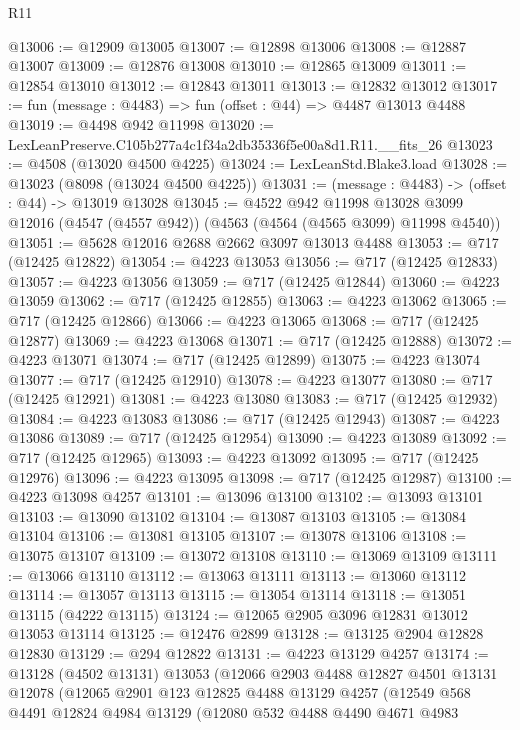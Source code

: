 \begin{lexlean}{R11}
\begin{coremodule}
@13006 := @12909 @13005
@13007 := @12898 @13006
@13008 := @12887 @13007
@13009 := @12876 @13008
@13010 := @12865 @13009
@13011 := @12854 @13010
@13012 := @12843 @13011
@13013 := @12832 @13012
@13017 := fun (message : @4483) => fun (offset : @44) => @4487 @13013 @4488
@13019 := @4498 @942 @11998
@13020 := LexLeanPreserve.C105b277a4c1f34a2db35336f5e00a8d1.R11.__fits_26
@13023 := @4508 (@13020 @4500 @4225)
@13024 := LexLeanStd.Blake3.load
@13028 := @13023 (@8098 (@13024 @4500 @4225))
@13031 := (message : @4483) -> (offset : @44) -> @13019 @13028
@13045 := @4522
    @942
    @11998
    @13028
    @3099
    @12016
    (@4547 (@4557 @942))
    (@4563 (@4564 (@4565 @3099) @11998 @4540))
@13051 := @5628 @12016 @2688 @2662 @3097 @13013 @4488
@13053 := @717 (@12425 @12822)
@13054 := @4223 @13053
@13056 := @717 (@12425 @12833)
@13057 := @4223 @13056
@13059 := @717 (@12425 @12844)
@13060 := @4223 @13059
@13062 := @717 (@12425 @12855)
@13063 := @4223 @13062
@13065 := @717 (@12425 @12866)
@13066 := @4223 @13065
@13068 := @717 (@12425 @12877)
@13069 := @4223 @13068
@13071 := @717 (@12425 @12888)
@13072 := @4223 @13071
@13074 := @717 (@12425 @12899)
@13075 := @4223 @13074
@13077 := @717 (@12425 @12910)
@13078 := @4223 @13077
@13080 := @717 (@12425 @12921)
@13081 := @4223 @13080
@13083 := @717 (@12425 @12932)
@13084 := @4223 @13083
@13086 := @717 (@12425 @12943)
@13087 := @4223 @13086
@13089 := @717 (@12425 @12954)
@13090 := @4223 @13089
@13092 := @717 (@12425 @12965)
@13093 := @4223 @13092
@13095 := @717 (@12425 @12976)
@13096 := @4223 @13095
@13098 := @717 (@12425 @12987)
@13100 := @4223 @13098 @4257
@13101 := @13096 @13100
@13102 := @13093 @13101
@13103 := @13090 @13102
@13104 := @13087 @13103
@13105 := @13084 @13104
@13106 := @13081 @13105
@13107 := @13078 @13106
@13108 := @13075 @13107
@13109 := @13072 @13108
@13110 := @13069 @13109
@13111 := @13066 @13110
@13112 := @13063 @13111
@13113 := @13060 @13112
@13114 := @13057 @13113
@13115 := @13054 @13114
@13118 := @13051 @13115 (@4222 @13115)
@13124 := @12065 @2905 @3096 @12831 @13012 @13053 @13114
@13125 := @12476 @2899
@13128 := @13125 @2904 @12828 @12830
@13129 := @294 @12822
@13131 := @4223 @13129 @4257
@13174 := @13128
    (@4502 @13131)
    @13053
    (@12066
      @2903
      @4488
      @12827
      @4501
      @13131
      @12078
      (@12065
        @2901
        @123
        @12825
        @4488
        @13129
        @4257
        (@12549
          @568
          @4491
          @12824
          @4984
          @13129
          (@12080
            @532
            @4488
            @4490
            @4671
            @4983

\end{coremodule}
\end{lexlean}
